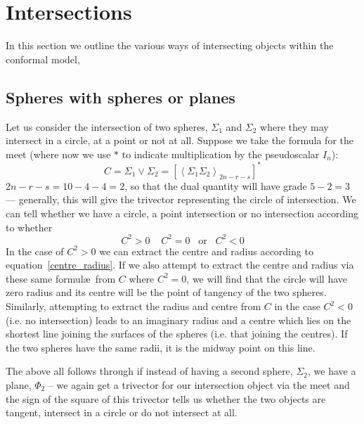 \section{Intersections}

In this section we outline the various ways of intersecting
objects within the conformal model,

\subsection{Spheres with spheres or planes}

Let us consider the intersection of two spheres, $\Sigma_1$ and
$\Sigma_2$ where they may intersect in a circle, at a point or not
at all. Suppose we take the formula for the meet\cite{GA:llw} (where now we use
$*$ to indicate multiplication by the pseudoscalar $I_n$):
%
\begin{equation}
C = \Sigma_1 \vee \Sigma_2 = \left[\left< \Sigma_1 \Sigma_2
\right>_{2n-r-s}\right]^*
\end{equation}
%
$2n-r-s = 10-4-4=2$, so that the dual quantity will have
grade $5-2=3$ --- generally, this will give the trivector
representing the circle of intersection. We can tell
whether we have a circle, a point intersection or no
intersection according to whether
%
\begin{equation}
C^2 >0 \;\;\;\; C^2 = 0 \;\;\;\mbox{or}\;\;\; C^2<0
\end{equation}
%
In the case of $C^2>0$ we can extract the centre and radius
according to equation~\ref{centre_radius}. If we also attempt to
extract the centre and radius via these same formul\ae\ from $C$
where $C^2=0$, we will find that the circle will have zero radius
and its centre will be the point of tangency of the two spheres.
Similarly, attempting to extract the radius and centre from $C$ in
the case $C^2<0$ (i.e. no intersection) leads to an imaginary
radius and a centre which lies on the shortest line joining the
surfaces of the spheres (i.e. that joining the centres). If the
two spheres have the same radii, it is the midway point on this
line.

The above all follows through if instead of having a
second sphere, $\Sigma_2$, we have a plane, $\Phi_2$ -- we again get a
trivector for our intersection object via the meet and the sign of the square
of this trivector tells us whether the two objects are tangent, intersect in a
circle or do not intersect at all.



